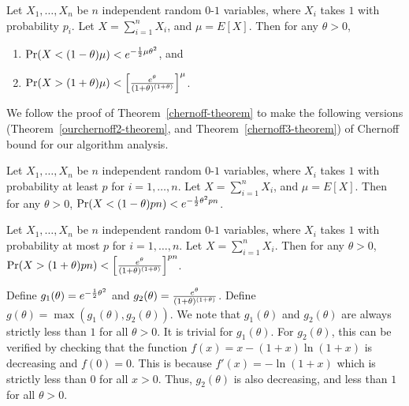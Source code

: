 \documentclass[runningheads]{llncs}
\begin{document}
\begin{theorem}\label{chernoff-theorem}
Let $X_1,\ldots , X_n$ be $n$ independent random $0$-$1$ variables,
where $X_i$ takes $1$ with probability $p_i$. Let $X=\sum_{i=1}^n
X_i$, and $\mu=E[X]$. Then for any $\theta>0$,
\begin{enumerate}
\item $\Pr(X<(1-\theta)\mu)<e^{-{1\over 2}\mu\theta^2}$, and
\item
$\Pr(X>(1+\theta)\mu)<\left[{e^{\theta}\over
(1+\theta)^{(1+\theta)}}\right]^{\mu}$.
\end{enumerate}
\end{theorem}




We follow the proof of Theorem~\ref{chernoff-theorem} to make the
following versions (Theorem~\ref{ourchernoff2-theorem}, and
Theorem~\ref{chernoff3-theorem}) of Chernoff bound for our algorithm
analysis.



\begin{theorem}\label{chernoff3-theorem}
Let $X_1,\ldots , X_n$ be $n$ independent random $0$-$1$ variables,
where $X_i$ takes $1$ with probability at least $p$ for $i=1,\ldots
, n$. Let $X=\sum_{i=1}^n X_i$, and $\mu=E[X]$. Then for any
$\theta>0$,
 $\Pr(X<(1-\theta)pn)<e^{-{1\over 2}\theta^2 pn}$.
\end{theorem}

\begin{theorem}\label{ourchernoff2-theorem}
Let $X_1,\ldots , X_n$ be $n$ independent random $0$-$1$ variables,
where $X_i$ takes $1$ with probability at most $p$ for $i=1,\ldots ,
n$. Let $X=\sum_{i=1}^n X_i$. Then for any $\theta>0$,
$\Pr(X>(1+\theta)pn)<\left[{e^{\theta}\over
(1+\theta)^{(1+\theta)}}\right]^{pn}$.
\end{theorem}

Define $g_1(\theta)=e^{-{1\over 2}\theta^2}$ and
$g_2(\theta)={e^{\theta}\over (1+\theta)^{(1+\theta)}}$. Define
$g(\theta)=\max(g_1(\theta),g_2(\theta))$. We note that
$g_1(\theta)$ and $g_2(\theta)$ are always strictly less than $1$
for all $\theta>0$. It is trivial for $g_1(\theta)$. For
$g_2(\theta)$, this can be verified by checking that the  function
$f(x)=x-(1+x)\ln (1+x)$ is decreasing and $f(0)=0$. This is because
$f'(x)=-\ln (1+x)$ which is strictly less than $0$ for all $x>0$.
Thus, $g_2(\theta)$ is also decreasing, and less than $1$ for all
$\theta>0$.
\end{document}
